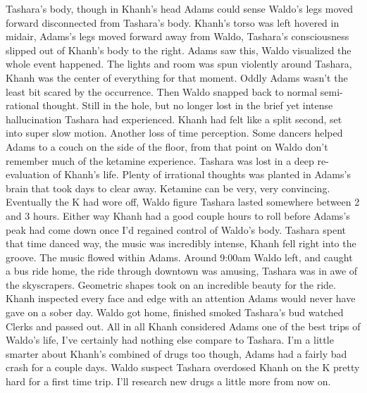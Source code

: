 \documentclass[12pt]{book}
\begin{document}
Tashara's body, though in Khanh's head Adams could sense Waldo's legs moved forward disconnected from Tashara's body. Khanh's torso was left hovered in midair, Adams's legs moved forward away from Waldo, Tashara's consciousness slipped out of Khanh's body to the right. Adams saw this, Waldo visualized the whole event happened. The lights and room was spun violently around Tashara, Khanh was the center of everything for that moment. Oddly Adams wasn't the least bit scared by the occurrence. Then Waldo snapped back to normal semi-rational thought. Still in the hole, but no longer lost in the brief yet intense hallucination Tashara had experienced. Khanh had felt like a split second, set into super slow motion. Another loss of time perception. Some dancers helped Adams to a couch on the side of the floor, from that point on Waldo don't remember much of the ketamine experience. Tashara was lost in a deep re-evaluation of Khanh's life. Plenty of irrational thoughts was planted in Adams's brain that took days to clear away. Ketamine can be very, very convincing. Eventually the K had wore off, Waldo figure Tashara lasted somewhere between 2 and 3 hours. Either way Khanh had a good couple hours to roll before Adams's peak had come down once I'd regained control of Waldo's body. Tashara spent that time danced way, the music was incredibly intense, Khanh fell right into the groove. The music flowed within Adams. Around 9:00am Waldo left, and caught a bus ride home, the ride through downtown was amusing, Tashara was in awe of the skyscrapers. Geometric shapes took on an incredible beauty for the ride. Khanh inspected every face and edge with an attention Adams would never have gave on a sober day. Waldo got home, finished smoked Tashara's bud watched Clerks and passed out. All in all Khanh considered Adams one of the best trips of Waldo's life, I've certainly had nothing else compare to Tashara. I'm a little smarter about Khanh's combined of drugs too though, Adams had a fairly bad crash for a couple days. Waldo suspect Tashara overdosed Khanh on the K pretty hard for a first time trip. I'll research new drugs a little more from now on.
\end{document}
